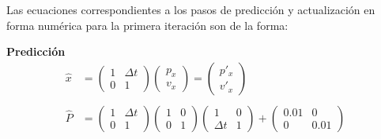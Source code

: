 Las ecuaciones correspondientes a los pasos de predicción y actualización en forma numérica para la primera iteración son de la forma:

\textbf{Predicción}
\begin{align*}
    \hat{x}&=\begin{pmatrix}1 & \Delta t \\ 0 & 1 \end{pmatrix} \begin{pmatrix} p_x \\ v_x \end{pmatrix} = \begin{pmatrix} p'_{x} \\ v'_{x} \end{pmatrix} \\ \\
    \hat{P}&=\begin{pmatrix} 1 & \Delta t \\ 0 & 1 \end{pmatrix} \begin{pmatrix} 1 & 0 \\ 0 & 1 \end{pmatrix} \begin{pmatrix} 1 & 0 \\ \Delta t & 1 \end{pmatrix} + \begin{pmatrix} 0.01 & 0 \\ 0 & 0.01 \end{pmatrix}
\end{align*}


